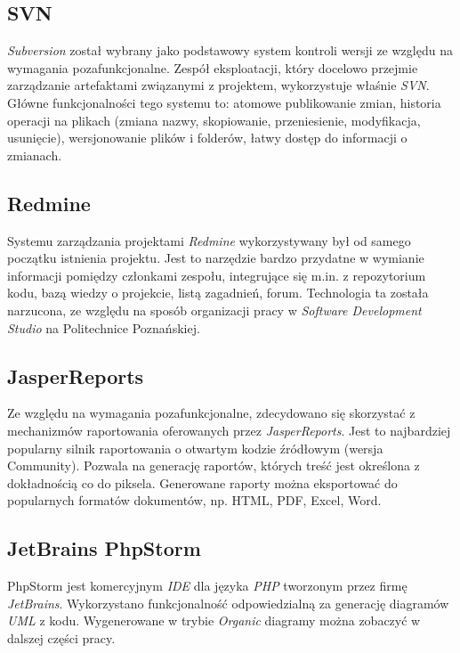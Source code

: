 \subsection{SVN}
\label{Chapter637}

\emph{Subversion} został wybrany jako podstawowy system kontroli wersji ze względu na wymagania pozafunkcjonalne. Zespół eksploatacji, który docelowo przejmie zarządzanie artefaktami związanymi z projektem, wykorzystuje właśnie \textit{SVN}. Główne funkcjonalności tego systemu to: atomowe publikowanie zmian, historia operacji na plikach (zmiana nazwy, skopiowanie, przeniesienie, modyfikacja, usunięcie), wersjonowanie plików i folderów, łatwy dostęp do informacji o zmianach.

\subsection{Redmine}
\label{Chapter638}

Systemu zarządzania projektami \emph{Redmine} wykorzystywany był od samego początku istnienia projektu. Jest to narzędzie bardzo przydatne w wymianie informacji pomiędzy członkami zespołu, integrujące się m.in. z repozytorium kodu, bazą wiedzy o projekcie, listą zagadnień, forum.  Technologia ta została narzucona, ze względu na sposób organizacji pracy w \textit{Software Development Studio} na Politechnice Poznańskiej.

\subsection{JasperReports}
\label{Chapter639}

Ze względu na wymagania pozafunkcjonalne, zdecydowano się skorzystać z mechanizmów raportowania oferowanych przez \emph{JasperReports}. Jest to najbardziej popularny silnik raportowania o otwartym kodzie źródłowym (wersja Community). Pozwala na generację raportów, których treść jest określona z dokładnością co do piksela. Generowane raporty można eksportować do popularnych formatów dokumentów, np. HTML, PDF, Excel, Word.

\subsection{JetBrains PhpStorm}
\label{Chapter63a}

PhpStorm jest komercyjnym \emph{IDE} dla języka \emph{PHP} tworzonym przez firmę \emph{JetBrains}. Wykorzystano funkcjonalność odpowiedzialną za generację diagramów \emph{UML} z kodu. Wygenerowane w trybie \emph{Organic} diagramy można zobaczyć w dalszej części pracy.